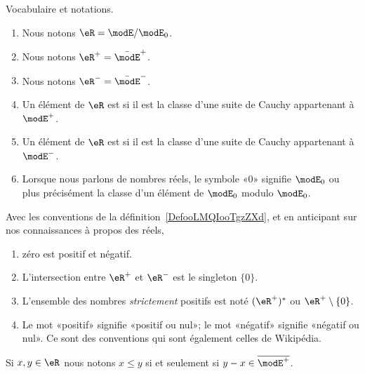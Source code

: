 \begin{definition}        \label{DefooLMQIooTgzZXd}
	Vocabulaire et notations.
	\begin{enumerate}
		\item
		      Nous notons \( \eR=\modE/\modE_0\).
		\item
		      Nous notons \( \eR^+=\bar\modE^+\).
		\item
		      Nous notons \( \eR^-=\bar\modE^-\).
		\item
		      Un élément de \( \eR\) est  si il est la classe d'une suite de Cauchy appartenant à \( \modE^+\).
		\item
		      Un élément de \( \eR\) est  si il est la classe d'une suite de Cauchy appartenant à \( \modE^-\).
		\item
		      Lorsque nous parlons de nombres réels, le symbole «\( 0\)» signifie \( \modE_0\) ou plus précisément la classe d'un élément de \( \modE_0\) modulo \( \modE_0\).
	\end{enumerate}
\end{definition}

\begin{normaltext}\label{REMooOCXLooKQrDoq}
	Avec les conventions de la définition~\ref{DefooLMQIooTgzZXd}, et en anticipant sur nos connaissances à propos des réels,
	\begin{enumerate}
		\item
		      zéro est positif et négatif.
		\item
		      L'intersection entre \( \eR^+\) et \( \eR^-\) est le singleton \( \{ 0 \}\).
		\item
		      L'ensemble des nombres \emph{strictement} positifs est noté \( (\eR^+)^*\) ou \( \eR^+\setminus\{ 0 \}\).
		\item
		      Le mot «positif» signifie «positif ou nul»; le mot «négatif» signifie «négatif ou nul». Ce sont des conventions qui sont également celles de Wikipédia\cite{ooSBSSooTlnuKi}.
	\end{enumerate}

\end{normaltext}

\begin{definition}      \label{DEFooBXHJooOEYPRI}
    Si \( x,y\in \eR\) nous notons \( x\leq y\) si et seulement si \( y-x\in\overline{ \modE^+ }\).
\end{definition}

